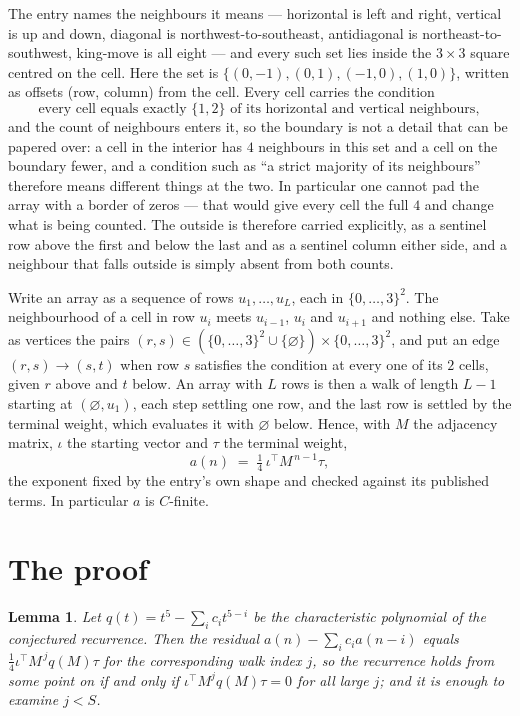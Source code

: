\documentclass[11pt,a4paper]{article}
\theoremstyle{plain}
\newtheorem{lemma}[theorem]{Lemma}
\theoremstyle{definition}
\begin{document}
The entry names the neighbours it means --- horizontal is left and right, vertical is up and
down, diagonal is northwest-to-southeast, antidiagonal is northeast-to-southwest, king-move is
all eight --- and every such set lies inside the $3\times3$ square centred on the cell. Here
the set is $\{(0,-1), (0,1), (-1,0), (1,0)\}$, written as offsets (row, column) from the cell. Every cell carries
the condition
\[
\text{every cell equals exactly }\{1,2\}\text{ of its horizontal and vertical neighbours},
\]
and the count of neighbours enters it, so the boundary is not a detail that can be papered
over: a cell in the interior has $4$ neighbours in this set and a cell on the boundary
fewer, and a condition such as ``a strict majority of its neighbours'' therefore means
different things at the two. In particular one cannot pad the array with a border of zeros ---
that would give every cell the full $4$ and change what is being counted. The outside is
therefore carried
explicitly, as a sentinel row above the first and below the last and as a sentinel column
either side, and a neighbour that falls outside is simply absent from both counts.

Write an array as a sequence of rows $u_1,\dots,u_L$, each in
$\{0,\dots,3\}^{2}$. The neighbourhood of a cell in row $u_i$ meets $u_{i-1}$,
$u_i$ and $u_{i+1}$ and nothing else. Take as vertices the pairs
$(r,s)\in(\{0,\dots,3\}^{2}\cup\{\varnothing\})\times\{0,\dots,3\}^{2}$,
and put an edge $(r,s)\to(s,t)$ when row $s$ satisfies the condition at every one of its
$2$ cells, given $r$ above and $t$ below. An array with $L$ rows is then a walk of length
$L-1$ starting at $(\varnothing,u_1)$, each step settling one row, and the last row is
settled by the terminal weight, which evaluates it with $\varnothing$ below. Hence,
with $M$ the adjacency matrix, $\iota$ the starting vector and $\tau$ the terminal weight,
\[
a(n)\;=\;\tfrac1{4}\,\iota^{\!\top}M^{\,n-1}\tau ,
\]
the exponent fixed by the entry's own shape and checked against its published terms. In
particular $a$ is $C$-finite.

\section{The proof}

\begin{lemma}\label{lem:crit}
Let $q(t)=t^{5}-\sum_i c_it^{5-i}$ be the characteristic polynomial of the
conjectured recurrence. Then the residual $a(n)-\sum_ic_ia(n-i)$ equals
$\tfrac1{4}\iota^{\!\top}M^{\,j}q(M)\tau$ for the corresponding walk index $j$, so the
recurrence holds from some point on if and only if $\iota^{\!\top}M^{j}q(M)\tau=0$ for all
large $j$; and it is enough to examine $j<S$.
\end{lemma}
\end{document}
